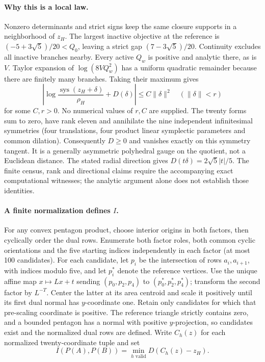 \paragraph{Why this is a local law.}
Nonzero determinants and strict signs keep the same closure supports in a
neighborhood of $z_H$. The largest inactive objective at the reference is
$(-5+3\sqrt5)/20<Q_0$, leaving a strict gap
$(7-3\sqrt5)/20$. Continuity excludes all inactive branches nearby.
Every active $Q_w$ is positive and analytic there, as is $V$. Taylor
expansion of $\log(8VQ_w^2)$ has a uniform quadratic remainder because
there are finitely many branches. Taking their maximum gives
\[
 \left|\log\frac{\operatorname{sys}(z_H+\delta)}{\rho_H}
                      +D(\delta)\right|\leq C\|\delta\|^2
 \quad(\|\delta\|<r)
\]
for some $C,r>0$. No numerical values of $r,C$ are supplied.
The twenty forms sum to zero, have rank eleven and annihilate the nine
independent infinitesimal symmetries (four translations, four product
linear symplectic parameters and common dilation). Consequently
$D\geq0$ and vanishes exactly on this symmetry tangent. It is a generally
asymmetric polyhedral gauge on the quotient, not a Euclidean distance.
The stated radial direction gives $D(t\delta)=2\sqrt5|t|/5$.
The finite census, rank and directional claims require the accompanying
exact computational witnesses; the analytic argument alone does not
establish those identities.

\paragraph{A finite normalization defines $I$.}
For any convex pentagon product, choose interior origins in both factors,
then cyclically order the dual rows.
Enumerate both factor roles, both common cyclic orientations and the five
starting indices independently in each factor (at most 100 candidates).
For each candidate, let $p_i$ be the intersection of rows $a_i,a_{i+1}$,
with indices modulo five, and let $p_i^*$ denote the reference vertices.
Use the unique affine map $x\mapsto Lx+t$ sending
$(p_0,p_2,p_4)$ to $(p_0^*,p_2^*,p_4^*)$; transform the second factor
by $L^{-T}$. Center the latter at its area centroid and scale it
positively until its first dual normal has $y$-coordinate one.
Retain only candidates for which that pre-scaling coordinate is positive.
The reference triangle strictly contains zero, and a bounded pentagon
has a normal with positive $y$-projection, so candidates exist and the
normalized dual rows are defined. Write $C_h(z)$ for each normalized
twenty-coordinate tuple and set
\[
 I(P(A),P(B))=\min_{h\text{ valid}}D(C_h(z)-z_H).
\]

